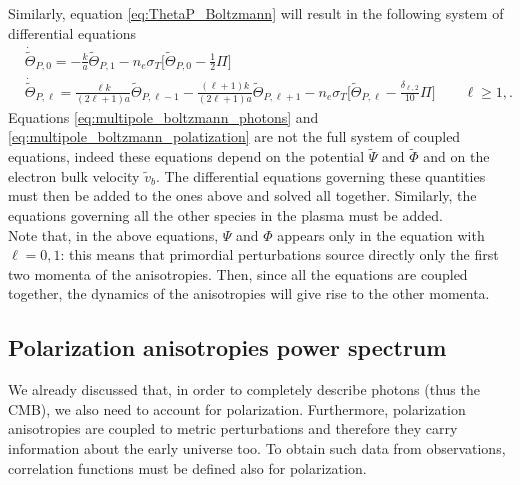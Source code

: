 Similarly, equation \eqref{eq:ThetaP_Boltzmann} will result in the following system of differential equations
\begin{subequations}\label{eq:multipole_boltzmann_polatization}
    \begin{align}
           &\dot{\tilde{\Theta}}_{P,0}=-\frac{k}{a}\tilde{\Theta}_{P,1}-n_e\sigma_T\bigg[\tilde\Theta_{P,0}-\frac{1}{2}\Pi\bigg]\label{eq:multipole_boltzmann_polatization_0}\\
            &\dot{\tilde{\Theta}}_{P,\ell}=\frac{\ell k}{(2\ell+1)a}\tilde\Theta_{P,\ell-1}-\frac{(\ell+1)k}{(2\ell+1)a}\tilde\Theta_{P,\ell+1}-n_e\sigma_T\bigg[\tilde\Theta_{P,\ell}-\frac{\delta_{\ell,2}}{10}\Pi\bigg]\qquad \ell\geq 1,\label{eq:multipole_boltzmann_polatization_2}.
        \end{align}
\end{subequations}  
Equations \eqref{eq:multipole_boltzmann_photons} and \eqref{eq:multipole_boltzmann_polatization} are not the full system of coupled equations, indeed these equations depend on the potential $\tilde\Psi$ and $\tilde\Phi$ and on the electron bulk velocity $\tilde v_b$. The differential equations governing these quantities must then be added to the ones above and solved all together. Similarly, the equations governing all the other species in the plasma must be added.\\
Note that, in the above equations, $\Psi$ and $\Phi$ appears only in the equation with $\ell=0,1$: this means that primordial perturbations source directly only the first two momenta of the anisotropies. Then, since all the equations are coupled together, the dynamics of the anisotropies will give rise to the other momenta.
\subsection{Polarization anisotropies power spectrum}\label{sec:PolarizationPowerSpectrum}
We already discussed that, in order to completely describe photons (thus the CMB), we also need to account for polarization. Furthermore, polarization anisotropies are coupled to metric perturbations and therefore they carry information about the early universe too. To obtain such data from observations, correlation functions must be defined also for polarization.

